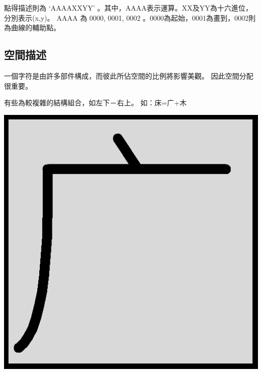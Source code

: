 點得描述則為 `AAAAXXYY' 。其中，AAAA表示運算。XX及YY為十六進位，分別表示(x,y)。
AAAA 為 0000, 0001, 0002 。0000為起始，0001為畫到，0002則為曲線的輔助點。


\subsection{空間描述}
一個字符是由許多部件構成，而彼此所佔空間的比例將影響美觀。
因此空間分配很重要。

有些為較複雜的結構組合，如左下－右上。
如：床=广+木

\begin{center}
\includegraphics[scale=0.25]{picture/yan.png}
\end{center}

